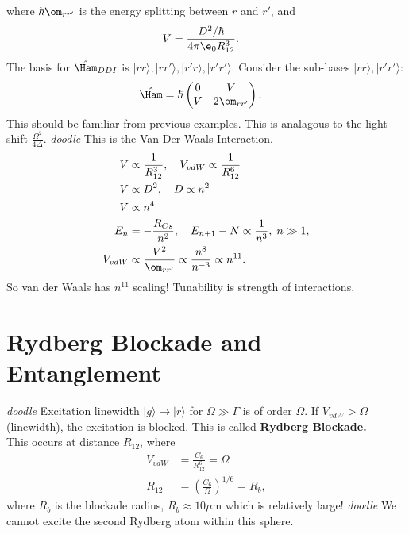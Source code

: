 \documentclass[lasers.tex]{subfiles}
\begin{document}
where $\hbar\om_{rr'}$ is the energy splitting between $r$ and $r'$, and 
\begin{align}
    V &= \frac{D^2/\hbar}{4\pi\e_0 R_{12}^3}.
\end{align}
The basis for $\hat{\Ham}_{DDI}$ is $|rr\rangle,|rr'\rangle,|r'r\rangle,|r'r'\rangle$.
Consider the sub-bases $|rr\rangle,|r'r'\rangle$:
\begin{align}
    \hat{\Ham} &= \hbar\begin{pmatrix} 0 & V \\ V & 2\om_{rr'}\end{pmatrix}.
\end{align}
This should be familiar from previous examples.
This is analagous to the light shift $\frac{\Omega^2}{4\Delta}$.
\textit{doodle}
This is the Van Der Waals Interaction.
\begin{align}
    V &\propto \frac{1}{R_{12}^3},\quad V_{vdW} \propto \frac{1}{R_{12}^6} \\
    V &\propto D^2,\quad D\propto n^2 \\
    V &\propto n^4 \\ 
    E_n &= -\frac{R_{Cs}}{n^2},\quad E_{n+1} -N \propto \frac{1}{n^3},\; n\gg 1, \\
    V_{vdW} &\propto \frac{V^2}{\om_{rr'}} \propto \frac{n^8}{n^{-3}} \propto n^{11}.
\end{align}
So van der Waals has $n^{11}$ scaling! 
Tunability is strength of interactions.

\chapter{Rydberg Blockade and Entanglement}
\textit{doodle}
Excitation linewidth $|g\rangle\to|r\rangle$ for $\Omega\gg\Gamma$ is of order $\Omega$.
If $V_{vdW}>\Omega$ (linewidth), the excitation is blocked. 
This is called \textbf{Rydberg Blockade.}\\
This occurs at distance $R_{12}$, where 
\begin{align}
    V_{vdW} &= \frac{C_6}{R_{12}^6} = \Omega \\
    R_{12} &= \left(\frac{C_6}{\Omega}\right)^{1/6} = R_b,
\end{align}
where $R_b$ is the blockade radius, $R_b\approx10\mu$m which is relatively large!
\emph{doodle}
We cannot excite the second Rydberg atom within this sphere.
\end{document}
